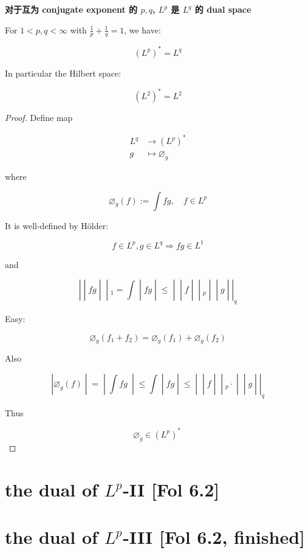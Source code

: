 \documentclass{qlnotes-export}
\begin{document}
\begin{theorem}{\protect{}\label{kn-conjugate-exponent-p-q-l-p-l-q-dual-space}{\textbf{对于互为
conjugate exponent 的 \(p,q\), \(L^{p}\) 是 \(L^{q}\) 的 dual space}}}

For \(1 < p,q < \infty\) with \(\frac{1}{p} + \frac{1}{q} = 1\), we have:

\[(L^{p})^{\ast} = L^{q}\]

In particular the Hilbert space:

\[(L^{2})^{\ast} = L^{2}\]

\end{theorem}

\begin{proof}

Define map

\[\begin{matrix}
L^{q} & {\rightarrow(L^{p})^{\ast}} \\
g & {\mapsto\varnothing_{g}}
\end{matrix}\]

where

\[\varnothing_{g}(f) := \int fg,\quad f \in L^{p}\]

It is well-defined by Hölder:

\[f \in L^{p},g \in L^{q}\Longrightarrow fg \in L^{1}\]

and

\[\left. | \middle| fg \middle| \middle| {}_{1} = \int \middle| fg \middle| \leq \middle| \middle| f \middle| \middle| {}_{p} \middle| \middle| g \middle| |_{q} \right.\]

Easy:

\[\varnothing_{g}(f_{1} + f_{2}) = \varnothing_{g}(f_{1}) + \varnothing_{g}(f_{2})\]

Also

\[\left. |\varnothing_{g}(f) \middle| = \middle| \int fg\  \middle| \leq \int \middle| fg \middle| \leq \middle| \middle| f \middle| \middle| {}_{p} \cdot \middle| \middle| g \middle| |_{q} \right.\]

Thus

\[\varnothing_{g} \in (L^{p})^{\ast}\ \]

\end{proof}

\section{\texorpdfstring{the dual of \(L^{p}\)-II {[}Fol 6.2{]}}{the dual of L\^{}\{p\}-II {[}Fol 6.2{]}}}

\section{\texorpdfstring{the dual of \(L^{p}\)-III {[}Fol 6.2, finished{]}}{the dual of L\^{}\{p\}-III {[}Fol 6.2, finished{]}}}

\printbibliography
\end{document}
